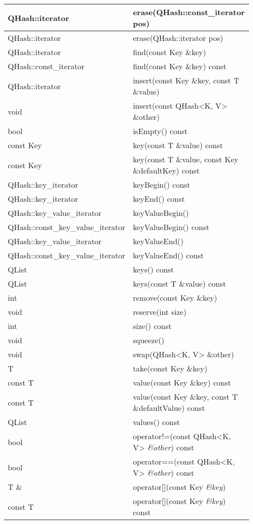 \begin{longtable}{|l|l|}
\hline
QHash::iterator &	erase(QHash::const\_iterator pos)\\
\hline
QHash::iterator &	erase(QHash::iterator pos)\\
\hline
QHash::iterator &	find(const Key \&key)\\
\hline
QHash::const\_iterator& 	find(const Key \&key) const\\
\hline
QHash::iterator 	&insert(const Key \&key, const T \&value)\\
\hline
void& 	insert(const QHash<K, V> \&other)\\
\hline
bool &	isEmpty() const\\
\hline
const Key& 	key(const T \&value) const\\
\hline
const Key &	key(const T \&value, const Key \&defaultKey) const\\
\hline
QHash::key\_iterator &	keyBegin() const\\
\hline
QHash::key\_iterator &	keyEnd() const\\
\hline
QHash::key\_value\_iterator 	&keyValueBegin()\\
\hline
QHash::const\_key\_value\_iterator& 	keyValueBegin() const\\
\hline
QHash::key\_value\_iterator 	&keyValueEnd()\\
\hline
QHash::const\_key\_value\_iterator &	keyValueEnd() const\\
\hline
QList& 	keys() const\\
\hline
QList& 	keys(const T \&value) const\\
\hline
int &	remove(const Key \&key)\\
\hline
void &	reserve(int size)\\
\hline
int &	size() const\\
\hline
void &	squeeze()\\
\hline
void &	swap(QHash<K, V> \&other)\\
\hline
T 	&take(const Key \&key)\\
\hline
const T &	value(const Key \&key) const\\
\hline
const T &	value(const Key \&key, const T \&defaultValue) const\\
\hline
QList 	&values() const\\
\hline
bool 	&operator!=(const QHash<K, V> \emph{\&other}) const\\
\hline
bool 	&operator==(const QHash<K, V> \emph{\&other}) const\\
\hline
T \& 	&operator[](const Key \emph{\&key})\\
\hline
const T& 	operator[](const Key \emph{\&key}) const\\
\hline
\end{longtable}

